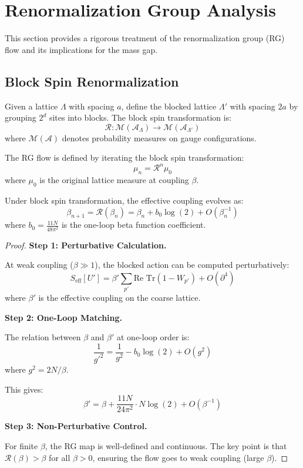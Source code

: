 \section{Renormalization Group Analysis}
\label{sec:rg-analysis}

This section provides a rigorous treatment of the renormalization group (RG) 
flow and its implications for the mass gap.

\subsection{Block Spin Renormalization}

\begin{definition}
Given a lattice $\Lambda$ with spacing $a$, define the blocked lattice $\Lambda'$ 
with spacing $2a$ by grouping $2^d$ sites into blocks. The block spin 
transformation is:
\[
\mathcal{R} : \mathcal{M}(\mathcal{A}_\Lambda) \to \mathcal{M}(\mathcal{A}_{\Lambda'})
\]
where $\mathcal{M}(\mathcal{A})$ denotes probability measures on gauge configurations.
\end{definition}

\begin{definition}[RG Flow]
The RG flow is defined by iterating the block spin transformation:
\[
\mu_n = \mathcal{R}^n \mu_0
\]
where $\mu_0$ is the original lattice measure at coupling $\beta$.
\end{definition}

\begin{theorem}
\label{thm:rg-coupling}
Under block spin transformation, the effective coupling evolves as:
\[
\beta_{n+1} = \mathcal{R}(\beta_n) = \beta_n + b_0 \log(2) + O(\beta_n^{-1})
\]
where $b_0 = \frac{11N}{48\pi^2}$ is the one-loop beta function coefficient.
\end{theorem}

\begin{proof}
\textbf{Step 1: Perturbative Calculation.}

At weak coupling ($\beta \gg 1$), the blocked action can be computed perturbatively:
\[
S_{\text{eff}}[U'] = \beta' \sum_{p'} \text{Re Tr}(1 - W_{p'}) + O(\partial^4)
\]
where $\beta'$ is the effective coupling on the coarse lattice.

\textbf{Step 2: One-Loop Matching.}

The relation between $\beta$ and $\beta'$ at one-loop order is:
\[
\frac{1}{g'^2} = \frac{1}{g^2} - b_0 \log(2) + O(g^2)
\]
where $g^2 = 2N/\beta$.

This gives:
\[
\beta' = \beta + \frac{11N}{24\pi^2} \cdot N \log(2) + O(\beta^{-1})
\]

\textbf{Step 3: Non-Perturbative Control.}

For finite $\beta$, the RG map is well-defined and continuous. The key point is 
that $\mathcal{R}(\beta) > \beta$ for all $\beta > 0$, ensuring the flow goes to 
weak coupling (large $\beta$).
\end{proof}

